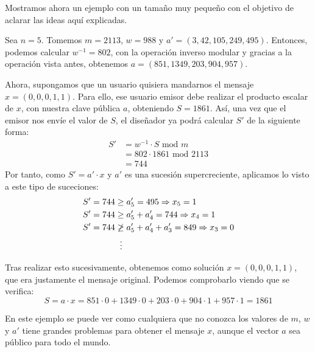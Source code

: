     Mostramos ahora un ejemplo con un tamaño muy pequeño con el objetivo de aclarar las ideas aquí explicadas.

    \begin{ejemplo} \label{ej:3.3}
        Sea $n = 5$. Tomemos $m = 2113$, $w = 988$ y $a' = (3, 42, 105, 249, 495)$. Entonces, podemos calcular $w^{-1} = 802$, con la operación inverso modular y gracias a la operación vista antes, obtenemos $a = (851, 1349, 203, 904, 957)$.
        
        Ahora, supongamos que un usuario quisiera mandarnos el mensaje $x = (0, 0, 0, 1, 1)$. Para ello, ese usuario emisor debe realizar el producto escalar de $x$, con nuestra clave pública $a$, obteniendo $S = 1861$. Así, una vez que el emisor nos envíe el valor de $S$, el diseñador ya podrá calcular $S'$ de la siguiente forma:
        \begin{align}
            S' &= w^{-1} \cdot S \text{ mod } m \\
               &= 802 \cdot 1861 \text{ mod } 2113 \\
               &= 744 
        \end{align}
        Por tanto, como $S' = a' \cdot x$ y $a'$ es una sucesión supercreciente, aplicamos lo visto a este tipo de suceciones:
        \begin{align}
            S' = 744 &\geq a'_{5} = 495 \Rightarrow x_{5} = 1 \\
            S' = 744 &\geq a'_{5} + a'_{4} = 744 \Rightarrow x_{4} = 1 \\
            S' = 744 &\not\geq a'_{5} + a'_{4} + a'_{3} = 849 \Rightarrow x_{3} = 0 \\
            &\hspace{0.2cm}\vdots
        \end{align}

        \newpage
        
        Tras realizar esto sucesivamente, obtenemos como solución $x = (0, 0, 0, 1, 1)$, que era justamente el mensaje original. Podemos comprobarlo viendo que se verifica:
        \begin{equation}
            S = a \cdot x = 851 \cdot 0 + 1349 \cdot 0 + 203 \cdot 0 + 904 \cdot 1 + 957 \cdot 1 = 1861
        \end{equation}
    \end{ejemplo}

    En este ejemplo se puede ver como cualquiera que no conozca los valores de $m$, $w$ y $a'$ tiene grandes problemas para obtener el mensaje $x$, aunque el vector $a$ sea público para todo el mundo.

